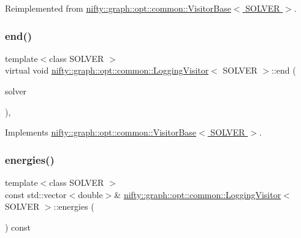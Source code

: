 Reimplemented from \hyperlink{classnifty_1_1graph_1_1opt_1_1common_1_1VisitorBase_a9ac54577b1a0378834ffe2029a321744}{nifty\+::graph\+::opt\+::common\+::\+Visitor\+Base$<$ S\+O\+L\+V\+E\+R $>$}.

\mbox{\label{classnifty_1_1graph_1_1opt_1_1common_1_1LoggingVisitor_a8597af1625d5499fa13c1890d92052a0}} 
\subsubsection{\texorpdfstring{end()}{end()}}
{\footnotesize\ttfamily template$<$class S\+O\+L\+V\+ER $>$ \\
virtual void \hyperlink{classnifty_1_1graph_1_1opt_1_1common_1_1LoggingVisitor}{nifty\+::graph\+::opt\+::common\+::\+Logging\+Visitor}$<$ S\+O\+L\+V\+ER $>$\+::end (\begin{DoxyParamCaption}\item[{\hyperlink{classnifty_1_1graph_1_1opt_1_1common_1_1LoggingVisitor_af6aa5fbf9acd4c1fa02fa34c73b90c1b}{Solver\+Type} $\ast$}]{solver }\end{DoxyParamCaption})\hspace{0.3cm}{\ttfamily [inline]}, {\ttfamily [virtual]}}



Implements \hyperlink{classnifty_1_1graph_1_1opt_1_1common_1_1VisitorBase_aab59ead6ecef2fcaf3da5a96d0ec4c51}{nifty\+::graph\+::opt\+::common\+::\+Visitor\+Base$<$ S\+O\+L\+V\+E\+R $>$}.

\mbox{\label{classnifty_1_1graph_1_1opt_1_1common_1_1LoggingVisitor_ae48f0bf94c4693a7f0c16bca10540373}} 
\subsubsection{\texorpdfstring{energies()}{energies()}}
{\footnotesize\ttfamily template$<$class S\+O\+L\+V\+ER $>$ \\
const std\+::vector$<$double$>$\& \hyperlink{classnifty_1_1graph_1_1opt_1_1common_1_1LoggingVisitor}{nifty\+::graph\+::opt\+::common\+::\+Logging\+Visitor}$<$ S\+O\+L\+V\+ER $>$\+::energies (\begin{DoxyParamCaption}{ }\end{DoxyParamCaption}) const\hspace{0.3cm}{\ttfamily [inline]}}



